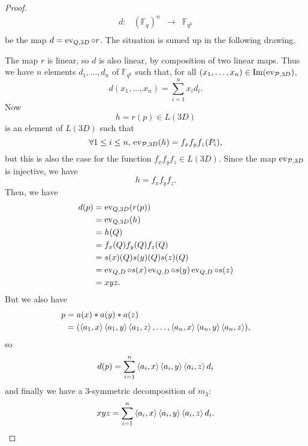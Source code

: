 \documentclass[a4paper,11pt]{article}
\begin{document}
\begin{proof}
\[\begin{array}{cccc}
          d: & (\mathbb{F}_{q})^n & \to & \mathbb{F}_{q^k} \\
\end{array}
  \]
  be the map $d = \operatorname{ev}_{Q, 3D}\circ r$.   The situation is sumed up in the
  following drawing.
  \begin{center}
\end{center}
The map $r$ is linear, so $d$ is also linear, by
  composition of two linear maps. Thus we have $n$ elements $d_1, \dots, d_n$ of
  $\mathbb{F}_{q^k}$ such that, for all $(x_1, \dots, x_n)\in\operatorname{Im}(\operatorname{ev}_{\mathcal{P},
  3D})$,
  \[
    d(x_1, \dots, x_n) = \sum_{i=1}^n x_i d_i.
  \]
Now
\[
  h = r(p)\in L(3D)
\]
is an element of $L(3D)$ such that
\[
  \forall 1\leq i\leq n,\,\operatorname{ev}_{\mathcal{P}, 3D}(h) = f_xf_yf_z(P_i),
\]
but this is also the case for the function $f_xf_yf_z\in L(3D)$. Since the map
$\operatorname{ev}_{\mathcal{P}, 3D}$ is injective, we have
\[
  h = f_xf_yf_z.
\]
Then, we have
\begin{equation*}
  \begin{split}
  d(p) &= \operatorname{ev}_{Q, 3D}(r(p))\\
  &= \operatorname{ev}_{Q, 3D}(h)\\
  &= h(Q)\\
  &= f_x(Q)f_y(Q)f_z(Q)\\
  &= s(x)(Q)s(y)(Q)s(z)(Q)\\
  &= \operatorname{ev}_{Q, D}\circ s(x)\operatorname{ev}_{Q, D}\circ s(y)\operatorname{ev}_{Q, D}\circ s(z)\\
  &= xyz.
  \end{split}
\end{equation*}
But we also have
\begin{equation*}
  \begin{split}
    p &= a(x)*a(y)*a(z)\\
    &= (\left\langle a_1,x\right\rangle\left\langle a_1,y\right\rangle\left\langle a_1,z\right\rangle, \dots,
    \left\langle a_n,x\right\rangle\left\langle a_n,y\right\rangle\left\langle a_n,z\right\rangle),
  \end{split}
\end{equation*}
so
\[
  d(p) = \sum_{i=1}^n\left\langle a_i,x\right\rangle\left\langle a_i,y\right\rangle\left\langle a_i,z\right\rangle d_i
\]
and finally we have a $3$-symmetric decomposition of $m_3$:
\[
  xyz = \sum_{i=1}^n\left\langle a_i,x\right\rangle\left\langle a_i,y\right\rangle\left\langle a_i,z\right\rangle d_i.
\]
\end{proof}
\end{document}
